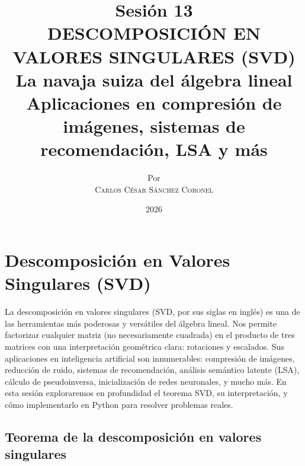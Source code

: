 \documentclass[12pt,a4paper,openany,oneside]{book}
\title{
    \textbf{Sesión 13} \\ 
    \Huge \textbf{DESCOMPOSICIÓN EN VALORES SINGULARES (SVD)} \\
    \large La navaja suiza del álgebra lineal \\
    \normalsize Aplicaciones en compresión de imágenes, sistemas de recomendación, LSA y más
}
\author{
    \small Por \\ \vspace{0.2cm}
    \Large \textsc{Carlos César Sánchez Coronel}
}
\date{2026}
\begin{document}
\maketitle
\tableofcontents
{}

\chapter{Descomposición en Valores Singulares (SVD)}

La descomposición en valores singulares (SVD, por sus siglas en inglés) es una de las herramientas más poderosas y versátiles del álgebra lineal. Nos permite factorizar cualquier matriz (no necesariamente cuadrada) en el producto de tres matrices con una interpretación geométrica clara: rotaciones y escalados. Sus aplicaciones en inteligencia artificial son innumerables: compresión de imágenes, reducción de ruido, sistemas de recomendación, análisis semántico latente (LSA), cálculo de pseudoinversa, inicialización de redes neuronales, y mucho más. En esta sesión exploraremos en profundidad el teorema SVD, su interpretación, y cómo implementarlo en Python para resolver problemas reales.

\section{Teorema de la descomposición en valores singulares}
\end{document}
